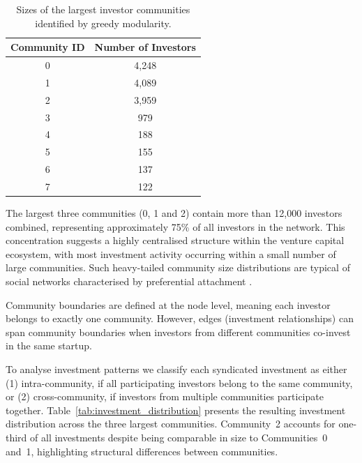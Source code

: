 \begin{table}[htp]
\centering
\begin{tabular}{|c|c|}
\hline
\textbf{Community ID} & \textbf{Number of Investors} \\
\hline
0 & 4,248 \\
1 & 4,089 \\
2 & 3,959 \\
3 & 979 \\
4 & 188 \\
5 & 155 \\
6 & 137 \\
7 & 122 \\
\hline
\end{tabular}
\caption{Sizes of the largest investor communities identified by greedy modularity.}
\label{tab:community_sizes}
\end{table}

The largest three communities (0, 1 and 2) contain more than 12{,}000 investors combined, representing approximately 75\% of all investors in the network. This concentration suggests a highly centralised structure within the venture capital ecosystem, with most investment activity occurring within a small number of large communities. Such heavy-tailed community size distributions are typical of social networks characterised by preferential attachment \cite{Barabasi1999,Borgatti2009}.


Community boundaries are defined at the node level, meaning each investor belongs to exactly one community. However, edges (investment relationships) can span community boundaries when investors from different communities co-invest in the same startup.

To analyse investment patterns we classify each syndicated investment as either (1) intra-community, if all participating investors belong to the same community, or (2) cross-community, if investors from multiple communities participate together. Table~\ref{tab:investment_distribution} presents the resulting investment distribution across the three largest communities. Community~2 accounts for one-third of all investments despite being comparable in size to Communities~0 and~1, highlighting structural differences between communities.

